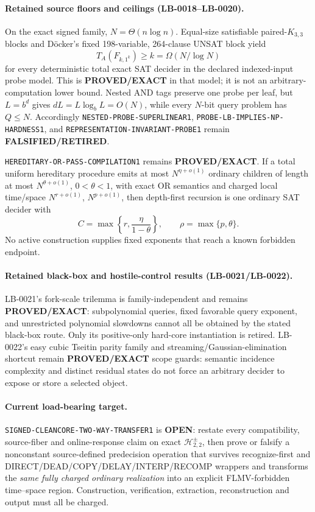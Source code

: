 \documentclass[11pt]{article}
\begin{document}
\paragraph{Retained source floors and ceilings (LB-0018--LB-0020).}
On the exact signed family, \(N=\Theta(n\log n)\).  Equal-size satisfiable
paired-\(K_{3,3}\) blocks and D\"ocker's fixed 198-variable,
264-clause UNSAT block yield
\[
 T_A(F_{k,1^k})\ge k=\Omega(N/\log N)
\]
for every deterministic total exact SAT decider in the declared
indexed-input probe model.  This is \textbf{PROVED/EXACT} in that model;
it is not an arbitrary-computation lower bound.  Nested AND tags preserve
one probe per leaf, but \(L=b^d\) gives
\(dL=L\log_bL=O(N)\), while every \(N\)-bit query problem has \(Q\le N\).
Accordingly \texttt{NESTED-PROBE-SUPERLINEAR1},
\texttt{PROBE-LB-IMPLIES-NP-HARDNESS1}, and
\texttt{REPRESENTATION-INVARIANT-PROBE1} remain
\textbf{FALSIFIED/RETIRED}.

\texttt{HEREDITARY-OR-PASS-COMPILATION1} remains
\textbf{PROVED/EXACT}.  If a total uniform hereditary procedure emits at
most \(N^{\eta+o(1)}\) ordinary children of length at most
\(N^{\theta+o(1)}\), \(0<\theta<1\), with exact OR semantics and charged
local time/space \(N^{r+o(1)}\), \(N^{p+o(1)}\), then depth-first recursion
is one ordinary SAT decider with
\[
 C=\max\left\{r,\frac{\eta}{1-\theta}\right\},
 \qquad \rho=\max\{p,\theta\}.
\]
No active construction supplies fixed exponents that reach a known
forbidden endpoint.

\paragraph{Retained black-box and hostile-control results (LB-0021/LB-0022).}
LB-0021's fork-scale trilemma is family-independent and remains
\textbf{PROVED/EXACT}: subpolynomial queries, fixed favorable query
exponent, and unrestricted polynomial slowdowns cannot all be obtained by
the stated black-box route.  Only its positive-only hard-core
instantiation is retired.  LB-0022's easy cubic Tseitin parity family and
streaming/Gaussian-elimination shortcut remain \textbf{PROVED/EXACT} scope
guards: semantic incidence complexity and distinct residual states do not
force an arbitrary decider to expose or store a selected object.

\paragraph{Current load-bearing target.}
\texttt{SIGNED-CLEANCORE-TWO-WAY-TRANSFER1} is \textbf{OPEN}: restate every
compatibility, source-fiber and online-response claim on exact
\(\mathcal H^{\pm}_{2,2}\), then prove or falsify a nonconstant
source-defined predecision operation that survives recognize-first and
DIRECT/DEAD/COPY/DELAY/INTERP/RECOMP wrappers and transforms the
\emph{same fully charged ordinary realization} into an explicit
FLMV-forbidden time--space region.  Construction, verification, extraction,
reconstruction and output must all be charged.
\end{document}
